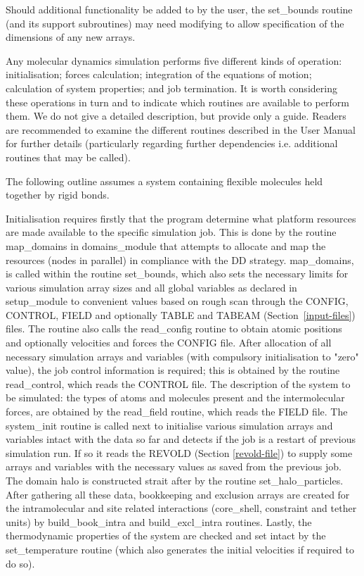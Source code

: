 Should additional functionality be added to \D by the user, the
{\sc set\_bounds} routine (and its support subroutines) may need
modifying to allow specification of the dimensions of any new
arrays.

Any molecular dynamics simulation performs five different kinds of
operation: initialisation; forces calculation; integration of the
equations of motion; calculation of system properties; and job
termination.  It is worth considering these operations in turn and
to indicate which \D routines are available to perform them.  We do
not give a detailed description, but provide only a guide.  Readers
are recommended to examine the different routines described in the
\D User Manual for further details (particularly regarding further
dependencies i.e. additional routines that may be called).

The following outline assumes a system containing flexible molecules
held together by rigid bonds.

Initialisation requires firstly that the program determine what
platform resources are made available to the specific simulation
job.  This is done by the \D routine {\sc map\_domains} in
{\sc domains\_module} that attempts to allocate and map the
resources (nodes in parallel) in compliance with the DD
strategy.  {\sc map\_domains}, is called
within the routine {\sc set\_bounds}, which also sets the necessary
limits for various simulation array sizes and all global
variables as declared in {\sc setup\_module} to convenient values
based on rough scan through the CONFIG, CONTROL, FIELD and optionally
TABLE and TABEAM (Section~\ref{input-files}) files.  The routine also
calls the {\sc read\_config} routine to obtain atomic positions and
optionally velocities and forces the CONFIG file.  After allocation
of all necessary simulation arrays and variables (with compulsory
initialisation to "zero" value), the job control information is
required; this is obtained by the routine {\sc read\_control}, which
reads the CONTROL file.  The description of the system to be
simulated: the types of atoms and molecules present and the
intermolecular forces, are obtained by the {\sc read\_field} routine,
which reads the FIELD file.  The {\sc system\_init} routine is
called next to initialise various simulation arrays and variables
intact with the data so far and detects if the job is a restart of
previous simulation run.  If so it reads the REVOLD (Section
\ref{revold-file}) to supply some arrays and variables with the
necessary values as saved from the previous job.  The domain halo is
constructed strait after by the routine {\sc set\_halo\_particles}.
After gathering all these data, bookkeeping and exclusion arrays are
created for the intramolecular and site related interactions
(core\_shell, constraint and tether units) by {\sc build\_book\_intra}
and {\sc build\_excl\_intra} routines.  Lastly, the thermodynamic
properties of the system are checked and set intact by the
{\sc set\_temperature} routine (which also generates the initial
velocities if required to do so).

